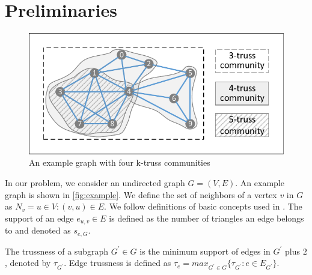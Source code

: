 \section{Preliminaries}
\label{preliminary}

\begin{figure}[ht]
    \centering
    \includegraphics[width=0.7\linewidth, trim={0.6cm 0.6cm, 0.6cm, 0.6cm}, clip]{./figures/k-truss.pdf}
		\vspace{-0.2cm}
    \caption{An example graph with four k-truss communities}
    \label{fig:example}
		\vspace{-0.2cm}
\end{figure}

In our problem, we consider an undirected graph $G = (V,E)$. An example graph is shown in \autoref{fig:example}.
We define the set of neighbors of a vertex $v$ in $G$ as $N_v = {u \in V :(v, u) \in E}$. %
We follow definitions of basic concepts used in \cite{huang2014querying}. The support of an edge $e_{u,v} \in E$ is defined as the number of triangles an edge belongs to and denoted as $s_{e,G}$. 



\begin{Def}[Trussness] 
The trussness of a subgraph $G^{\prime} \in G$ is the minimum support of edges in $G^{\prime}$ plus $2$, denoted by $\tau_{G^{\prime}}$. Edge trussness is defined as $\tau_{e} = max_{G^{\prime} \in G}\{\tau_{G^{\prime}}: e \in E_{G^{\prime}}\}$.
\label{def:trussness}
\end{Def}

